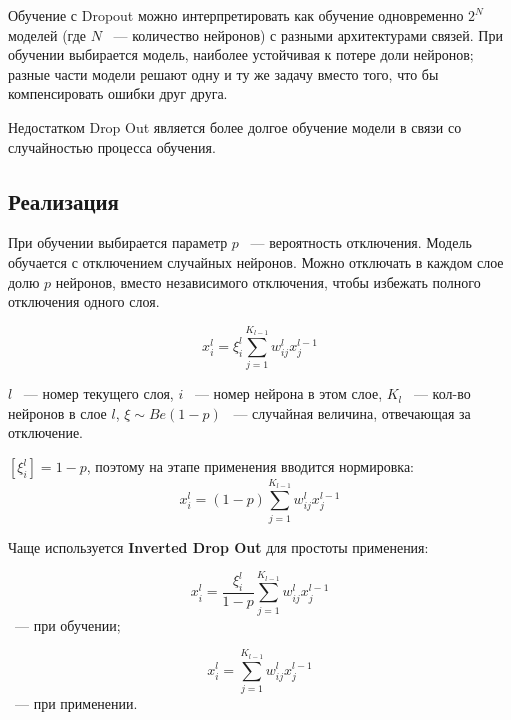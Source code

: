 Обучение с Dropout можно интерпретировать как обучение одновременно $2^N$ моделей (где $N$ ~--- количество нейронов) с разными архитектурами связей. При обучении выбирается модель, наиболее устойчивая к потере доли нейронов; разные части модели решают одну и ту же задачу вместо того, что бы компенсировать ошибки друг друга.

Недостатком Drop Out является более долгое обучение модели в связи со случайностью процесса обучения.

\subsection{Реализация}
При обучении выбирается параметр $p$ ~--- вероятность отключения. Модель обучается с отключением случайных нейронов. Можно отключать в каждом слое долю $p$ нейронов, вместо независимого отключения, чтобы избежать полного отключения одного слоя.

$$x_i^l = \xi_i^l \sum_{j=1}^{K_{l-1}} w_{ij}^l x_j^{l-1} $$

$l$ ~--- номер текущего слоя, $i$ ~--- номер нейрона в этом слое, $K_l$ ~--- кол-во нейронов в слое $l$, $\xi \sim Be(1-p)$ ~--- случайная величина, отвечающая за отключение.

$\left[\xi_i^l\right] = 1-p$, поэтому на этапе применения вводится нормировка:
$$x_i^l = (1-p) \sum_{j=1}^{K_{l-1}} w_{ij}^l x_j^{l-1} $$

Чаще используется \textbf{Inverted Drop Out} для простоты применения:

$$x_i^l = \frac{\xi_i^l}{1-p} \sum_{j=1}^{K_{l-1}} w_{ij}^l x_j^{l-1} $$
~--- при обучении;

$$x_i^l = \sum_{j=1}^{K_{l-1}} w_{ij}^l x_j^{l-1} $$
~--- при применении.

